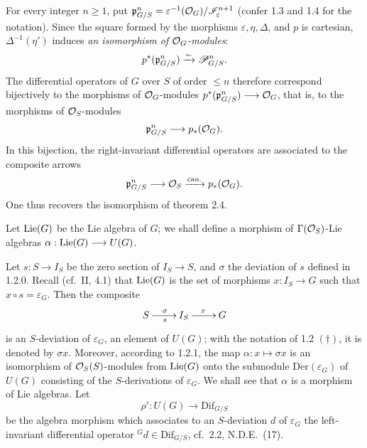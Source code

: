 For every integer $n\geq1$, put $\mathfrak p_{G/S}^n=\varepsilon^{-1}(\mathcal{O}_G)/\mathscr I_\varepsilon^{n+1}$ (confer 1.3 and 1.4 for the notation). Since the square formed by the morphisms $\varepsilon,\eta,\Delta$, and $p$ is cartesian, $\Delta^{-1}(\eta')$ induces \emph{an isomorphism of $\mathcal{O}_G$-modules}:
\[
p^*(\mathfrak p_{G/S}^n)\xrightarrow{\sim}\mathscr P_{G/S}^n.
\]
The differential operators of $G$ over $S$ of order $\leq n$ therefore correspond bijectively to the morphisms of $\mathcal{O}_G$-modules $p^*(\mathfrak p_{G/S}^n)\longrightarrow\mathcal{O}_G$, that is, to the morphisms of $\mathcal{O}_S$-modules
\[
\mathfrak p_{G/S}^n\longrightarrow p_*(\mathcal{O}_G).
\]
In this bijection, the right-invariant differential operators are associated to the composite arrows
\[
\mathfrak p_{G/S}^n\longrightarrow\mathcal{O}_S\xrightarrow{\mathrm{can.}}p_*(\mathcal{O}_G).
\]
One thus recovers the isomorphism of theorem 2.4.

Let $\operatorname{Lie}(G)$ be the Lie algebra of $G$; we shall define a morphism of $\Gamma(\mathcal{O}_S)$-Lie algebras $\alpha:\operatorname{Lie}(G)\longrightarrow U(G)$.

Let $s:S\to I_S$ be the zero section of $I_S\to S$, and $\sigma$ the deviation of $s$ defined in 1.2.0. Recall (cf.\ II, 4.1) that $\operatorname{Lie}(G)$ is the set of morphisms $x:I_S\to G$ such that $x\circ s=\varepsilon_G$. Then the composite
\[
\xymatrix{S\ar[r]^\sigma_s&I_S\ar[r]^x&G}
\]
is an $S$-deviation of $\varepsilon_G$, \ie an element of $U(G)$; with the notation of 1.2 $(\dagger)$, it is denoted by $\sigma x$. Moreover, according to 1.2.1, the map $\alpha:x\mapsto\sigma x$ is an isomorphism of $\mathcal{O}_S(S)$-modules from $\operatorname{Lie}(G)$ onto the submodule $\operatorname{D\acute er}(\varepsilon_G)$ of $U(G)$ consisting of the $S$-derivations of $\varepsilon_G$. We shall see that $\alpha$ is a morphism of Lie algebras. Let
\[
\rho':U(G)\longrightarrow\mathrm{Dif}_{G/S}
\]
be the algebra morphism which associates to an $S$-deviation $d$ of $\varepsilon_G$ the left-invariant differential operator ${}^Gd\in\mathrm{Dif}_{G/S}$, cf.\ 2.2, N.D.E.\ (17).

